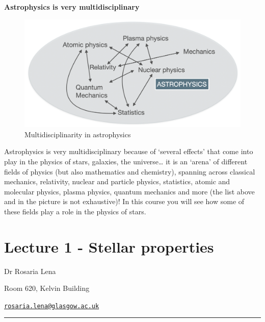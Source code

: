 \documentclass[
  letterpaper,
  DIV=11,
  numbers=noendperiod]{scrreprt}
\begin{document}
\textbf{Astrophysics is very multidisciplinary}

\begin{figure}

{\centering \includegraphics{img/astrophysics_multidisciplinary.png}

}

\caption{Multidisciplinarity in astrophysics}

\end{figure}

Astrophysics is very multidisciplinary because of `several effects' that
come into play in the physics of stars, galaxies, the universe\ldots{}
it is an `arena' of different fields of physics (but also mathematics
and chemistry), spanning across classical mechanics, relativity, nuclear
and particle physics, statistics, atomic and molecular physics, plasma
physics, quantum mechanics and more (the list above and in the picture
is not exhaustive)! In this course you will see how some of these fields
play a role in the physics of stars.


\hypertarget{lecture-1---stellar-properties}{%
\chapter{Lecture 1 - Stellar
properties}\label{lecture-1---stellar-properties}}

Dr Rosaria Lena

Room 620, Kelvin Building

\href{mailto:rosaria.lena@glasgow.ac.uk}{\nolinkurl{rosaria.lena@glasgow.ac.uk}}

\begin{center}\rule{0.5\linewidth}{0.5pt}\end{center}

\end{document}
